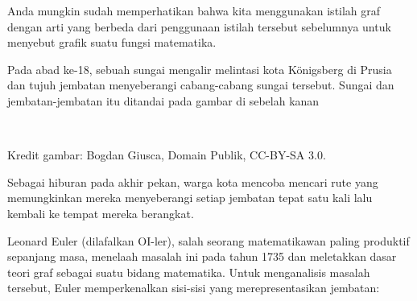Anda mungkin sudah memperhatikan bahwa kita menggunakan istilah graf dengan arti yang berbeda dari penggunaan istilah tersebut sebelumnya untuk menyebut grafik suatu fungsi matematika.

\begin{example}{}

Pada abad ke-18, sebuah sungai mengalir melintasi kota K\"onigsberg di Prusia dan tujuh jembatan menyeberangi cabang-cabang sungai tersebut.  Sungai dan jembatan-jembatan itu ditandai pada gambar di sebelah kanan
\begin{center}
\\\par{}\label{fig:Konigsberg_bridges}%

{\small Kredit gambar: Bogdan Giusca, Domain Publik, CC-BY-SA 3.0.}
\end{center}

Sebagai hiburan pada akhir pekan, warga kota mencoba mencari rute yang memungkinkan mereka menyeberangi setiap jembatan tepat satu kali lalu kembali ke tempat mereka berangkat.

Leonard Euler (dilafalkan OI-ler), salah seorang matematikawan paling produktif sepanjang masa, menelaah masalah ini pada tahun 1735 dan meletakkan dasar teori graf sebagai suatu bidang matematika.  Untuk menganalisis masalah tersebut, Euler memperkenalkan sisi-sisi yang merepresentasikan jembatan:
\begin{center}
\par{}\label{fig:graphtheory-dor1-tikz03}%


\end{center}
\end{example}
